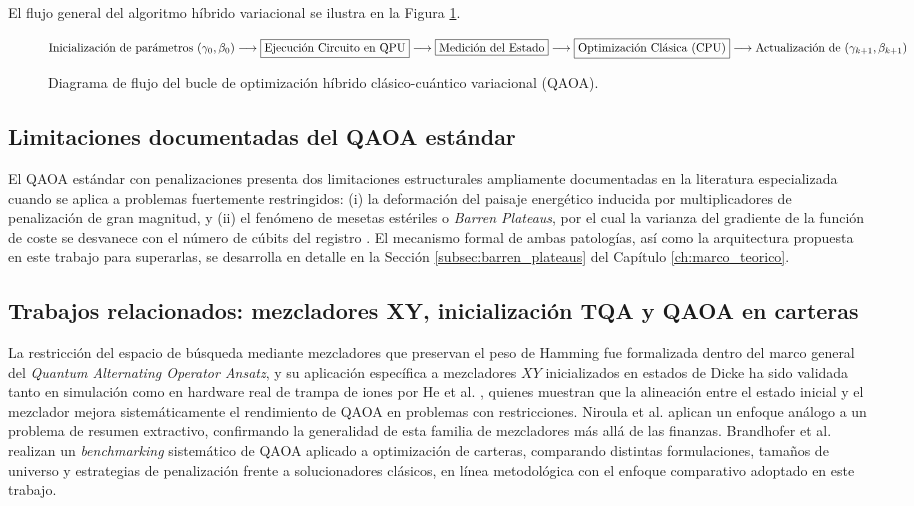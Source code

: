 El flujo general del algoritmo híbrido variacional se ilustra en la Figura \ref{fig:flujo_qaoa}.

\begin{figure}[htbp]
    \centering
    \vspace*{0.5cm}
    $\text{Inicialización de parámetros } (\gamma_0, \beta_0) \longrightarrow \framebox{Ejecución Circuito en QPU} \longrightarrow \framebox{Medición del Estado} \longrightarrow \framebox{Optimización Clásica (CPU)} \longrightarrow \text{Actualización de } (\gamma_{k+1}, \beta_{k+1})$
    \vspace*{0.5cm}
    \caption{Diagrama de flujo del bucle de optimización híbrido clásico-cuántico variacional (QAOA).}
    \label{fig:flujo_qaoa}
\end{figure}


\subsection{Limitaciones documentadas del QAOA estándar}
\label{subsec:limitaciones_qaoa}

El QAOA estándar con penalizaciones
presenta dos limitaciones estructurales ampliamente documentadas en la
literatura especializada cuando se aplica a problemas fuertemente
restringidos: (i) la deformación del paisaje energético inducida por
multiplicadores de penalización de gran magnitud, y (ii) el fenómeno de
mesetas estériles o \textit{Barren Plateaus}, por el cual la varianza del
gradiente de la función de coste se desvanece con el número de cúbits del
registro \cite{McClean2018}. El mecanismo formal de ambas patologías, así
como la arquitectura propuesta en este trabajo para superarlas, se
desarrolla en detalle en la Sección \ref{subsec:barren_plateaus} del
Capítulo \ref{ch:marco_teorico}.

\subsection{Trabajos relacionados: mezcladores XY, inicialización TQA y QAOA en carteras}
\label{subsec:trabajos_relacionados}

La restricción del espacio de búsqueda mediante mezcladores que preservan el peso de
Hamming fue formalizada dentro del marco general del \textit{Quantum Alternating
Operator Ansatz}\cite{Hadfield2019}, y su aplicación específica a mezcladores $XY$ inicializados en estados
de Dicke ha sido validada tanto en simulación como en hardware real de trampa de iones
por He et al. \cite{He2023}, quienes muestran que la alineación entre el estado inicial y
el mezclador mejora sistemáticamente el rendimiento de QAOA en problemas con
restricciones. Niroula et al. \cite{Niroula2022} aplican un enfoque análogo a un problema
de resumen extractivo, confirmando la generalidad de esta familia de mezcladores más allá
de las finanzas. Brandhofer et al. \cite{Brandhofer2022} realizan un \textit{benchmarking}
sistemático de QAOA aplicado a optimización de carteras, comparando distintas
formulaciones, tamaños de universo y estrategias de penalización frente a solucionadores
clásicos, en línea metodológica con el enfoque comparativo adoptado en este trabajo.

